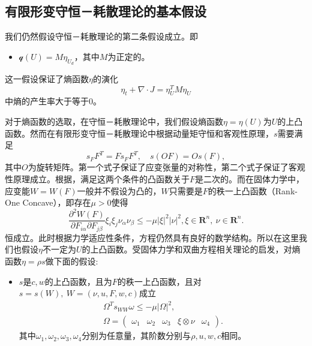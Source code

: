 \subsection{有限形变守恒－耗散理论的基本假设}
我们仍然假设守恒－耗散理论的第二条假设成立。即
\begin{itemize}
	\item $\mathcal{q}(U) = M \eta_{U_d}$，其中$M$为正定的。
\end{itemize}
这一假设保证了熵函数$\eta$的演化
\begin{equation}\label{eq:entropypro}
	\eta_t + \nabla \cdot J = \eta_U^T M \eta_U
\end{equation}
中熵的产生率大于等于$0$。

对于熵函数的选取，在守恒－耗散理论中，我们假设熵函数$\eta=\eta(U)$为$U$的上凸函数。然而在有限形变守恒－耗散理论中根据动量矩守恒和客观性原理，$s$需要满足
\begin{equation}\label{eq:sObjective}
	s_F F^T = F s_F F^T, \quad s(OF) = O s(F),
\end{equation}
其中$O$为旋转矩阵\cite{dafermos2013non}。第一个式子保证了应变张量的对称性，第二个式子保证了客观性原理成立。根据\cite{ball1976convexity}，满足这两个条件的凸函数关于$F$是二次的。而在固体力学中，应变能$W=W(F)$一般并不假设为凸的，$W$只需要是$F$的秩一上凸函数（Rank-One Concave），即存在$\mu>0$使得
\begin{equation*}
	\frac{\partial^2 W(F)}{\partial F_{i\alpha} \partial F_{j\beta}} \xi_i \xi_j \nu_\alpha \nu_\beta \le -\mu |\xi|^2 |\nu|^2, \xi \in \mathbf{R}^n, \ \nu \in \mathbf{R}^n. 
\end{equation*}
恒成立。此时根据力学适应性条件，方程仍然具有良好的数学结构。所以在这里我们也假设$\eta$不一定为$U$的上凸函数。受固体力学和双曲方程相关理论的启发，对熵函数$\eta = \rho s$做下面的假设:
\begin{itemize}
	\item $s$是$c,w$的上凸函数，且为$F$的秩一上凸函数，且对$s=s(W),\ W= (\nu,u,F,w,c)$成立
\begin{eqnarray}
	\Omega^T s_{WW} \omega \le -\mu |\Omega|^2, \label{eq:FCDFconvex}\\ 
	\Omega = \left( \begin{array}{cccccc}
		\omega_1 & \omega_2 & \omega_3 & \xi \otimes \nu & \omega_4
	\end{array}\right). \nonumber
\end{eqnarray}
其中$\omega_1,\omega_2,\omega_3,\omega_4$分别为任意量，其阶数分别与$\rho, u, w,c$相同。
\end{itemize}

